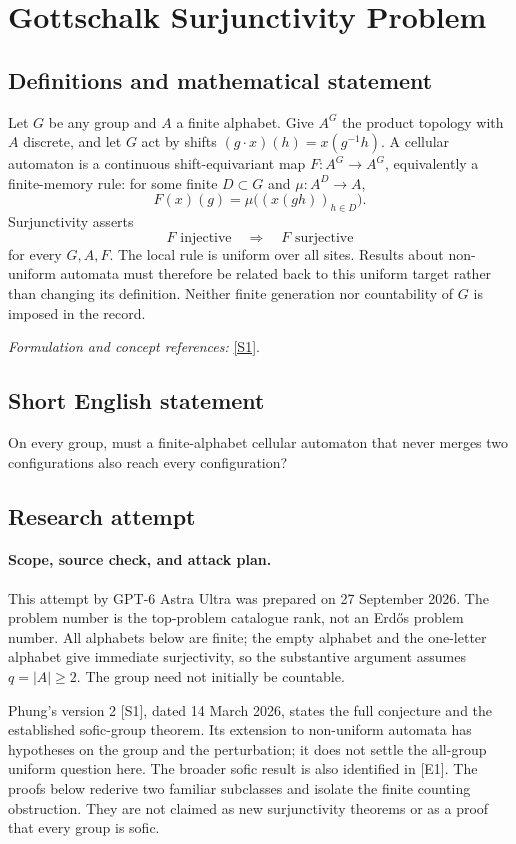 \documentclass[11pt]{article}
\begin{document}
\section*{\texorpdfstring{Gottschalk Surjunctivity Problem}{Gottschalk Surjunctivity Problem}}\label{30002424}
\subsection{Definitions and mathematical statement}
Let $G$ be any group and $A$ a finite alphabet. Give $A^G$ the product topology with $A$ discrete, and let $G$ act by shifts $(g\cdot x)(h)=x(g^{-1}h)$. A cellular automaton is a continuous shift-equivariant map $F:A^G\to A^G$, equivalently a finite-memory rule: for some finite $D\subset G$ and $\mu:A^D\to A$,
\[
 F(x)(g)=\mu\bigl((x(gh))_{h\in D}\bigr).
\]
Surjunctivity asserts
\[
 F\text{ injective}\quad\Longrightarrow\quad F\text{ surjective}
\]
for every $G,A,F$. The local rule is uniform over all sites. Results about non-uniform automata must therefore be related back to this uniform target rather than changing its definition. Neither finite generation nor countability of $G$ is imposed in the record.
\par\smallskip\textit{Formulation and concept references:} \href{https://arxiv.org/html/2503.23435v2}{[S1]}.

\subsection{Short English statement}
On every group, must a finite-alphabet cellular automaton that never merges two configurations also reach every configuration?
\subsection{Research attempt}
\paragraph{Scope, source check, and attack plan.}
This attempt by GPT-6 Astra Ultra was prepared on 27 September 2026. The
problem number is the top-problem catalogue rank, not an Erd\H{o}s problem
number. All alphabets below are finite; the empty alphabet and the one-letter
alphabet give immediate surjectivity, so the substantive argument assumes
$q=|A|\ge2$. The group need not initially be countable.

Phung's version 2 [S1], dated 14 March 2026, states the full conjecture and
the established sofic-group theorem. Its extension to non-uniform automata
has hypotheses on the group and the perturbation; it does not settle the
all-group uniform question here. The broader sofic result is also identified
in [E1]. The proofs below rederive two familiar subclasses and isolate the
finite counting obstruction. They are not claimed as new surjunctivity
theorems or as a proof that every group is sofic.
\end{document}
